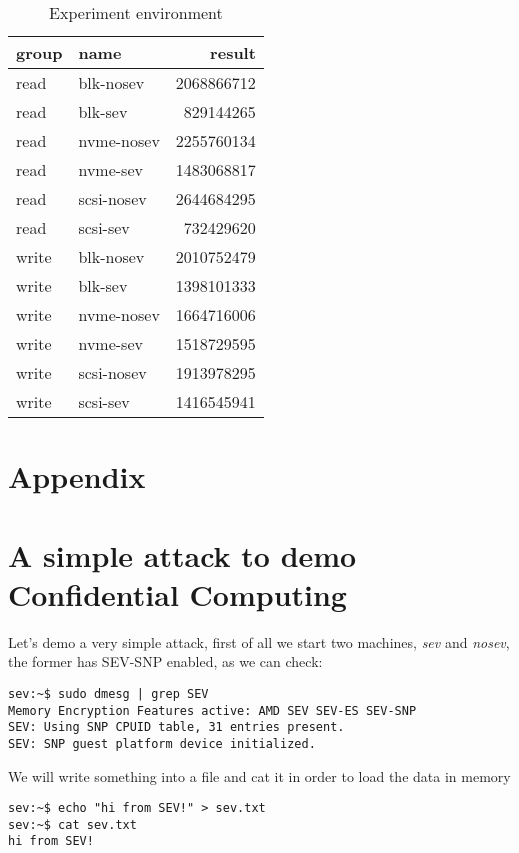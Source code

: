 \documentclass[twocolumn]{article}
\begin{document}
\begin{table*}
    \centering
    \label{tab:bw-results}
    \begin{tabular}{|l|l|r|}
    \hline
        group &       name &       result \\
    \hline
    read &  blk-nosev & 2068866712 \\
    read &    blk-sev &  829144265 \\
    read & nvme-nosev & 2255760134 \\
    read &   nvme-sev & 1483068817 \\
    read & scsi-nosev & 2644684295 \\
    read &   scsi-sev &  732429620 \\
    write &  blk-nosev & 2010752479 \\
    write &    blk-sev & 1398101333 \\
    write & nvme-nosev & 1664716006 \\
    write &   nvme-sev & 1518729595 \\
    write & scsi-nosev & 1913978295 \\
    write &   scsi-sev & 1416545941 \\
    \hline
    \end{tabular}
    \caption{Experiment environment}
\end{table*}




\printbibliography
\appendix
\section*{Appendix}
\section{A simple attack to demo Confidential Computing}
Let's demo a very simple attack, first of all we start two machines, \textit{sev} and \textit{nosev}, the former has SEV-SNP enabled, as we can check:

\begin{verbatim}
sev:~$ sudo dmesg | grep SEV
Memory Encryption Features active: AMD SEV SEV-ES SEV-SNP
SEV: Using SNP CPUID table, 31 entries present.
SEV: SNP guest platform device initialized.
\end{verbatim}

We will write something into a file and cat it in order to load the data in memory

\begin{verbatim}
sev:~$ echo "hi from SEV!" > sev.txt
sev:~$ cat sev.txt
hi from SEV!
\end{verbatim}
\end{document}
